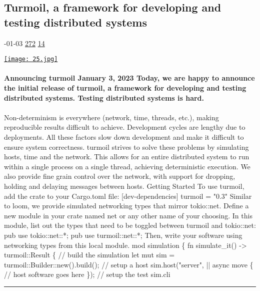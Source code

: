 \documentclass[10pt,a4paper]{article}
\begin{document}
\begin{multicols}{2}
\begin{minipage}{\linewidth}
\subsection{Turmoil, a framework for developing and testing distributed systems}
\textsc{\footnotesize
{\scriptsize\faCalendar}-01-03 
{\scriptsize\faThumbsOUp}\space 
\href{http://news.ycombinator.com/item?id=37163187\&utm\_term=comment}{272} 
{\scriptsize\faComments}\space 
\href{http://news.ycombinator.com/item?id=37163187\&utm\_term=comment}{14} 
}
\par\medskip\noindent
\href{https://tokio.rs/blog/2023-01-03-announcing-turmoil?utm\_source=hackernewsletter\&utm\_medium=email\&utm\_term=code}{
    \texttt{[image: 25.jpg]}
}
\end{minipage}
\paragraph{}
\textbf{Announcing turmoil
January 3, 2023
Today, we are happy to announce the initial release of
turmoil,
a framework for developing and testing distributed systems.
Testing distributed systems is hard.}
\paragraph{}
 Non-determinism is everywhere (network, time, threads, etc.), making reproducible results difficult to achieve. Development cycles are lengthy due to deployments. All these factors slow down development and make it difficult to ensure system correctness.
turmoil strives to solve these problems by simulating hosts, time and the
network. This allows for an entire distributed system to run within a single
process on a single thread, achieving deterministic execution. We also provide
fine grain control over the network, with support for dropping, holding and
delaying messages between hosts.
Getting Started
To use
turmoil, add the crate to your
Cargo.toml file:
[dev-dependencies] turmoil = "0.3"
Similar to
loom, we provide simulated networking types that mirror
tokio::net. Define a new module in your crate named
net or any other name of
your choosing. In this module, list out the types that need to be toggled
between
turmoil and
tokio::net:
pub use tokio::net::*; pub use turmoil::net::*;
Then, write your software using networking types from this local module.
mod simulation \{ fn simulate\_it() -> turmoil::Result \{ // build the simulation let mut sim = turmoil::Builder::new().build(); // setup a host sim.host("server", || async move \{ // host software goes here \}); // setup the test sim.cli
\par\noindent\textcolor{red}{\rule{\linewidth}{0.2mm}}
\vfill
\null
\noindent\begin{minipage}{\linewidth}

\end{minipage}
\end{multicols}
\end{document}
